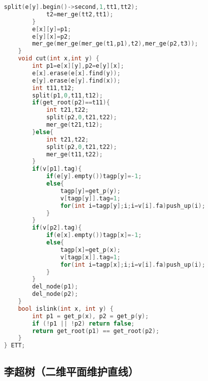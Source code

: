 \begin{lstlisting}[language=C++]
            split(e[y].begin()->second,1,tt1,tt2);
            t2=mer_ge(tt2,tt1);
        }
        e[x][y]=p1;
        e[y][x]=p2;
        mer_ge(mer_ge(mer_ge(t1,p1),t2),mer_ge(p2,t3));
    }
    void cut(int x,int y) {
        int p1=e[x][y],p2=e[y][x];
        e[x].erase(e[x].find(y));
        e[y].erase(e[y].find(x));
        int t11,t12;
        split(p1,0,t11,t12);
        if(get_root(p2)==t11){
            int t21,t22;
            split(p2,0,t21,t22);
            mer_ge(t21,t12);
        }else{
            int t21,t22;
            split(p2,0,t21,t22);
            mer_ge(t11,t22);
        }
        if(v[p1].tag){
            if(e[y].empty())tagp[y]=-1;
            else{
                tagp[y]=get_p(y);
                v[tagp[y]].tag=1;
                for(int i=tagp[y];i;i=v[i].fa)push_up(i);
            }
        }
        if(v[p2].tag){
            if(e[x].empty())tagp[x]=-1;
            else{
                tagp[x]=get_p(x);
                v[tagp[x]].tag=1;
                for(int i=tagp[x];i;i=v[i].fa)push_up(i);
            }
        }
        del_node(p1);
        del_node(p2);
    }
    bool islink(int x, int y) {
        int p1 = get_p(x), p2 = get_p(y);
        if (!p1 || !p2) return false;
        return get_root(p1) == get_root(p2);
    }
} ETT;
\end{lstlisting}

\subsection{李超树（二维平面维护直线）}

